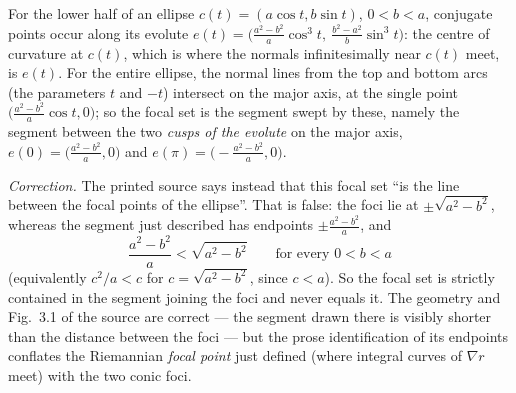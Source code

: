 \begin{remark}
  \label{rem:pet-ch3-conjugate-vs-focal-example}
  \leanok
  For the lower half of an ellipse $c(t)=(a\cos t,b\sin t)$, $0<b<a$, conjugate
  points occur along its evolute
  $e(t)=\big(\tfrac{a^2-b^2}{a}\cos^3t,\ \tfrac{b^2-a^2}{b}\sin^3t\big)$: the
  centre of curvature at $c(t)$, which is where the normals infinitesimally near
  $c(t)$ meet, is $e(t)$. For the entire ellipse, the normal lines from the top and
  bottom arcs (the parameters $t$ and $-t$) intersect on the major axis, at the
  single point $\big(\tfrac{a^2-b^2}{a}\cos t,0\big)$; so the focal set is the
  segment swept by these, namely the segment between the two \emph{cusps of the
  evolute} on the major axis, $e(0)=\big(\tfrac{a^2-b^2}{a},0\big)$ and
  $e(\pi)=\big(-\tfrac{a^2-b^2}{a},0\big)$.

  \emph{Correction.} The printed source says instead that this focal set ``is the
  line between the focal points of the ellipse''. That is false: the foci lie at
  $\pm\sqrt{a^2-b^2}$, whereas the segment just described has endpoints
  $\pm\tfrac{a^2-b^2}{a}$, and
  \[
    \frac{a^2-b^2}{a}<\sqrt{a^2-b^2}\qquad\text{for every }0<b<a
  \]
  (equivalently $c^2/a<c$ for $c=\sqrt{a^2-b^2}$, since $c<a$). So the focal set is
  strictly contained in the segment joining the foci and never equals it. The
  geometry and Fig.~3.1 of the source are correct — the segment drawn there is
  visibly shorter than the distance between the foci — but the prose identification
  of its endpoints conflates the Riemannian \emph{focal point} just defined (where
  integral curves of $\nabla r$ meet) with the two conic foci.
\end{remark}


